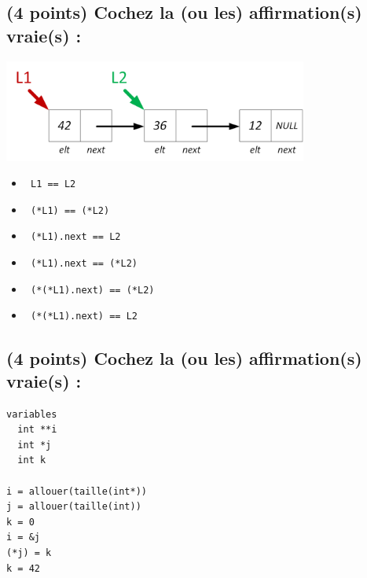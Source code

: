 \documentclass[11pt,a4paper]{article}
\begin{document}
\bigskip
\vspace*{1cm}


\subsection{(4 points) Cochez la (ou les) affirmation(s) vraie(s) : }

\begin{center}
\includegraphics[width=0.75\textwidth]{img/liste1.png}
\end{center}

\begin{itemize}
  \item[\CaseCoche] \lstinline[style=algorithmique]! L1 == L2 ! \\
  \item[\CaseCoche] \lstinline[style=algorithmique]! (*L1) == (*L2) ! \\
  \item[\checkmark] \lstinline[style=algorithmique]! (*L1).next == L2 ! \\
  \item[\CaseCoche] \lstinline[style=algorithmique]! (*L1).next == (*L2) ! \\
  \item[\checkmark] \lstinline[style=algorithmique]! (*(*L1).next) == (*L2) ! \\
  \item[\CaseCoche] \lstinline[style=algorithmique]! (*(*L1).next) == L2 ! \\
\end{itemize}


\vfillLast

\newpage

\subsection{(4 points) Cochez la (ou les) affirmation(s) vraie(s) : }

\begin{lstlisting}[style=algorithmique]
variables
  int **i
  int *j
  int k

i = allouer(taille(int*))
j = allouer(taille(int))
k = 0
i = &j
(*j) = k
k = 42
\end{lstlisting}
\end{document}
